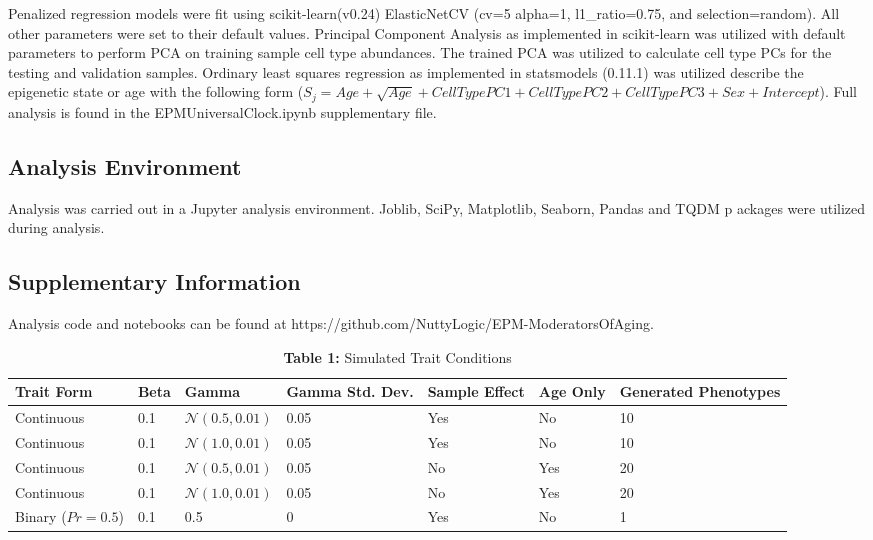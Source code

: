 \documentclass{article}
\begin{document}
{{\begin{linenumbers}
Penalized regression models were fit using scikit-learn(v0.24)\cite{Pedregosa2011-fi} 
ElasticNetCV (cv=5 alpha=1, l1\_ratio=0.75, and selection=random). All other parameters were set to their 
default values. Principal Component Analysis as implemented in scikit-learn was utilized with default parameters 
to perform PCA on training sample cell type abundances. The trained PCA was utilized to calculate cell type PCs 
for the testing and validation samples. Ordinary least squares regression as implemented in statsmodels 
(0.11.1)\cite{Seabold2010-lt} was utilized describe the epigenetic state or age with the following 
form ($S_j  = Age + \sqrt{Age} + Cell Type PC1 + Cell Type PC2 + Cell Type PC3 + Sex + Intercept$). 
Full analysis is found in the EPMUniversalClock.ipynb supplementary file. 

\subsection{Analysis Environment}

Analysis was carried out in a Jupyter\cite{Basu_undated-vq} analysis environment.
 Joblib\cite{Varoquaux2009-al}, SciPy\cite{Virtanen2020-wt}, Matplotlib\cite{Hunter2007-nq}, 
 Seaborn\cite{Waskom2021-gj}, Pandas\cite{McKinney2012-ta} and TQDM\cite{Da_Costa-Luis2019-lr} p
 ackages were utilized during analysis. 

\subsection{Supplementary Information}

Analysis code and notebooks can be found at https://github.com/NuttyLogic/EPM-ModeratorsOfAging.

\end{linenumbers}
\printbibliography



\begin{table}[H]
\caption*{\textbf{Table 1:} Simulated Trait Conditions}  
\begin{tabular}{| p{20mm} | p{15mm} | p{20mm} | p{20mm} | p{20mm} | p{20mm} | p{20mm} |}
\hline
\textbf{Trait Form}&\textbf{Beta}&\textbf{Gamma}&\textbf{Gamma Std. Dev.}&\textbf{Sample Effect}&
\textbf{Age Only}&\textbf{Generated Phenotypes}\\ \hline
Continuous&0.1&$\mathcal{N}(0.5, 0.01)$&0.05&Yes&No&10\\ \hline
Continuous&0.1&$\mathcal{N}(1.0, 0.01)$&0.05&Yes&No&10\\ \hline
Continuous&0.1&$\mathcal{N}(0.5, 0.01)$&0.05&No&Yes&20\\ \hline
Continuous&0.1&$\mathcal{N}(1.0, 0.01)$&0.05&No&Yes&20\\ \hline
Binary ($Pr=0.5$)&0.1&0.5&0&Yes&No&1\\ \hline
\end{tabular}
\end{table}

}}
\end{document}
